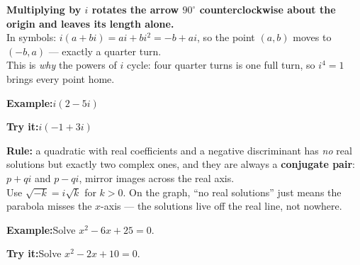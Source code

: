 \documentclass[12pt]{article}
\begin{document}
\begin{formulabox}\textbf{Multiplying by $i$ rotates the arrow $90^\circ$
counterclockwise about the origin and leaves its length alone.}\\[3pt]
In symbols: $i(a + bi) = ai + bi^{2} = -b + ai$, so the point $(a, b)$ moves to
$(-b, a)$ --- exactly a quarter turn.\\[2pt]
This is \emph{why} the powers of $i$ cycle: four quarter turns is one full turn,
so $i^{4} = 1$ brings every point home.
\end{formulabox}
\begin{examplebox}\textbf{Example:}\quad $i(2 - 5i)$
\end{examplebox}
\begin{tryitbox}\textbf{Try it:}\quad $i(-1 + 3i)$\\[2pt]
\end{tryitbox}

\begin{formulabox}\textbf{Rule:} a quadratic with real coefficients and a
negative discriminant has \emph{no} real solutions but exactly two complex ones,
and they are always a \textbf{conjugate pair}: $p + qi$ and $p - qi$, mirror
images across the real axis.\\[2pt]
Use $\sqrt{-k} = i\sqrt{k}$ for $k > 0$. On the graph, ``no real solutions''
just means the parabola misses the $x$-axis --- the solutions live off the real
line, not nowhere.
\end{formulabox}
\begin{examplebox}\textbf{Example:}\quad Solve $x^{2} - 6x + 25 = 0$.
\end{examplebox}
\begin{tryitbox}\textbf{Try it:}\quad Solve $x^{2} - 2x + 10 = 0$.\\[2pt]
\end{tryitbox}
\end{document}
